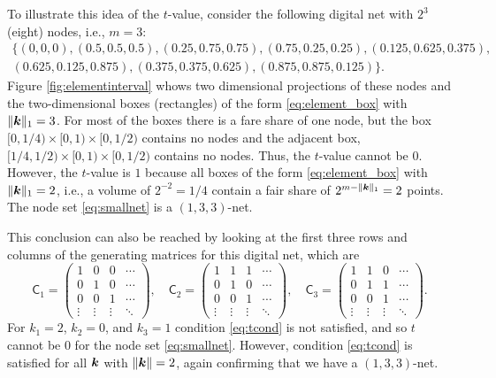 \documentclass{svproc}
\begin{document}
To illustrate this idea of the $t$-value, consider the following digital net with $2^3$ (eight) nodes, i.e., $m = 3$:
\begin{multline} \label{eq:smallnet}
	\{(0, 0,   0),
	(0.5,   0.5,   0.5  ),
	(0.25,  0.75,  0.75 ),
	(0.75,  0.25,  0.25 ),
	(0.125, 0.625, 0.375),\\
	(0.625, 0.125, 0.875),
	(0.375, 0.375, 0.625),
	(0.875, 0.875, 0.125)\}.
\end{multline}
Figure \ref{fig:elementinterval} whows two dimensional projections of these nodes and the two-dimensional boxes (rectangles) of the form \eqref{eq:element_box} with $\lVert{\boldsymbol{k}}\rVert_1 = 3$.  For most of the boxes there is a fare share of one node, but the box $[0,1/4) \times [0,1) \times [0,1/2)$ contains no nodes and the adjacent box, $[1/4,1/2) \times [0,1) \times [0,1/2)$ contains no nodes.  Thus, the $t$-value cannot be $0$.  However, the $t$-value is $1$ because all boxes of the form  \eqref{eq:element_box} with $\lVert{\boldsymbol{k}}\rVert_1 = 2$, i.e., a volume of $2^{-2} = 1/4$ contain a fair share of $2^{m- \lVert {\boldsymbol{k}} \rVert_1} = 2$ points.  The node set \eqref{eq:smallnet} is a $(1,3,3)$-net.

This conclusion can also be reached by looking at the first three rows and columns of the generating matrices for this digital net, which are
\begin{equation*}
	\mathsf{C}_1 = \begin{pmatrix}
		1 & 0 & 0 & \cdots \\ 0 & 1 & 0 & \cdots \\ 0 & 0 & 1 & \cdots \\ \vdots & \vdots & \vdots & \ddots
	\end{pmatrix}, \quad
	\mathsf{C}_2 = \begin{pmatrix}
		1 & 1 & 1 & \cdots \\ 0 & 1 & 0 & \cdots \\ 0 & 0 & 1 & \cdots \\ \vdots & \vdots & \vdots & \ddots
	\end{pmatrix}, \quad
	\mathsf{C}_3 = \begin{pmatrix}
	1 & 1 & 0 & \cdots \\ 0 & 1 & 1 & \cdots \\ 0 & 0 & 1 & \cdots \\ \vdots & \vdots & \vdots & \ddots
\end{pmatrix}.
\end{equation*}
For $k_1=2$, $k_2 = 0$, and $k_3 = 1$ condition \eqref{eq:tcond} is not satisfied, and so $t$ cannot be $0$ for the node set  \eqref{eq:smallnet}.  However, condition \eqref{eq:tcond} is satisfied for all ${\boldsymbol{k}}$ with $\lVert {\boldsymbol{k}} \rVert = 2$, again confirming that we have a $(1,3,3)$-net.
\end{document}
